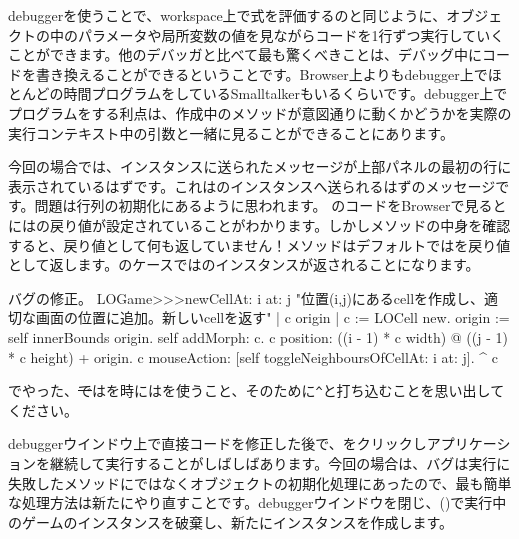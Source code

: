 \documentclass[a4paper,10pt,twoside]{book}
\begin{document}
debuggerを使うことで、workspace上で式を評価するのと同じように、オブジェクトの中のパラメータや局所変数の値を見ながらコードを1行ずつ実行していくことができます。他のデバッガと比べて最も驚くべきことは、デバッグ中にコードを書き換えることができるということです。Browser上よりもdebugger上でほとんどの時間プログラムをしているSmalltalkerもいるくらいです。debugger上でプログラムをする利点は、作成中のメソッドが意図通りに動くかどうかを実際の実行コンテキスト中の引数と一緒に見ることができることにあります。

今回の場合では、インスタンスに送られたメッセージが上部パネルの最初の行に表示されているはずです。これはのインスタンスへ送られるはずのメッセージです。問題は行列の初期化にあるように思われます。
のコードをBrowserで見るとにはの戻り値が設定されていることがわかります。しかしメソッドの中身を確認すると、戻り値として何も返していません！メソッドはデフォルトではを戻り値として返します。のケースではのインスタンスが返されることになります。

\dothis{debuggerウインドウを閉じで下さい。
その後、\ct{c}を返すために``\ct{^ c}''式を \ct{LOGame>>>newCellAt:at:}メソッドの最後に追加して下さい。
(\mthref{newCellAt:at:nobug}参照。)}

\begin{method}{バグの修正。}
LOGame>>>newCellAt: i at: j
   "位置(i,j)にあるcellを作成し、適切な画面の位置に追加。新しいcellを返す"
   | c origin |
   c := LOCell new.
   origin := self innerBounds origin.
   self addMorph: c.
   c position: ((i - 1) * c width) @ ((j - 1) * c height) + origin.
   c mouseAction: [self toggleNeighboursOfCellAt: i at: j].
   ^ c
\end{method}

\noindent
{}でやった、\st ではを時には\ct{^}を使うこと、そのために\verb|^|と打ち込むことを思い出してください。

debuggerウインドウ上で直接コードを修正した後で、をクリックしアプリケーションを継続して実行することがしばしばあります。今回の場合は、バグは実行に失敗したメソッドにではなくオブジェクトの初期化処理にあったので、最も簡単な処理方法は新たにやり直すことです。debuggerウインドウを閉じ、()で実行中のゲームのインスタンスを破棄し、新たにインスタンスを作成します。
\end{document}
